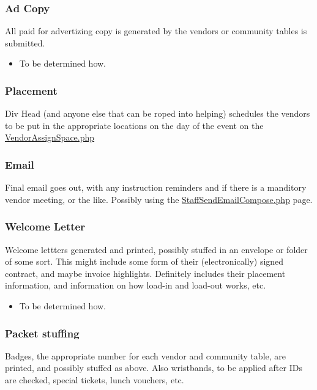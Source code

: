 \documentclass[captions=tablesignature]{scrartcl}
\begin{document}
\subsubsection{Ad Copy}
\label{sec-3-2-17}
All paid for advertizing copy is generated by the vendors or
community tables is submitted.
\begin{itemize}
\item To be determined how.
\end{itemize}

\subsubsection{Placement}
\label{sec-3-2-18}
Div Head (and anyone else that can be roped into helping)
schedules the vendors to be put in the appropriate locations on
the day of the event on the \href{../webpages/VendorAssignSpace.php}{VendorAssignSpace.php}

\subsubsection{Email}
\label{sec-3-2-19}
Final email goes out, with any instruction reminders and if there
is a manditory vendor meeting, or the like. Possibly using the
\href{../webpages/StaffSendEmailCompose.php}{StaffSendEmailCompose.php} page.

\subsubsection{Welcome Letter}
\label{sec-3-2-20}
Welcome lettters generated and printed, possibly stuffed in an
envelope or folder of some sort.
This might include some form of their (electronically) signed
contract, and maybe invoice highlights.  Definitely includes their
placement information, and information on how load-in and load-out
works, etc.
\begin{itemize}
\item To be determined how.
\end{itemize}

\subsubsection{Packet stuffing}
\label{sec-3-2-21}
Badges, the appropriate number for each vendor and community
table, are printed, and possibly stuffed as above.  Also
wristbands, to be applied after IDs are checked, special tickets,
lunch vouchers, etc.
\end{document}
